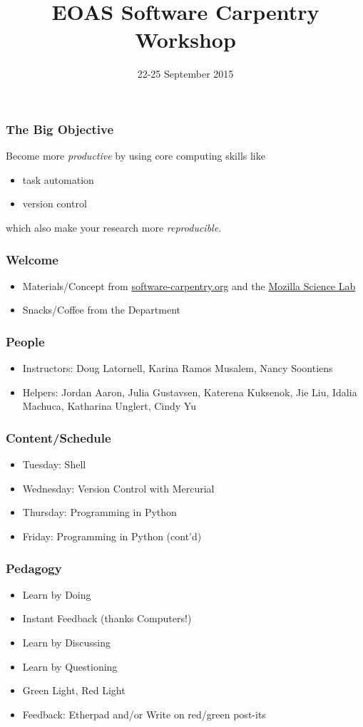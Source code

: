 \documentclass{beamer}
\title[]{EOAS Software Carpentry Workshop}
\subtitle[]{}
\date[]{22-25 September 2015}
\begin{document}




\begin{frame}[plain]
  \titlepage
\end{frame}


\begin{frame}
  \frametitle{The Big Objective}
  Become more {\em productive} by using core computing skills like
  \begin{itemize}
    \item task automation
    \item version control
  \end{itemize}
  which also make your research more {\em reproducible}.
\end{frame}


\begin{frame}
  \frametitle{Welcome}
  \begin{itemize}
    \item Materials/Concept from \href{http://software-carpentry.org/}{software-carpentry.org} and the \href{https://wiki.mozilla.org/ScienceLab}{Mozilla Science Lab}
    \item Snacks/Coffee from the Department
  \end{itemize}
\end{frame}


\begin{frame}
  \frametitle{People}
  \begin{itemize}
    \item Instructors: Doug Latornell, Karina Ramos Musalem, Nancy Soontiens
    \item Helpers: Jordan Aaron, Julia Gustavsen, Katerena Kuksenok, Jie Liu, Idalia Machuca, Katharina Unglert, Cindy Yu
  \end{itemize}
\end{frame}


\begin{frame}
  \frametitle{Content/Schedule}
  \begin{itemize}
    \item Tuesday: Shell
    \item Wednesday: Version Control with Mercurial
    \item Thursday: Programming in Python
    \item Friday: Programming in Python (cont'd)
  \end{itemize}
\end{frame}


\begin{frame}
  \frametitle{Pedagogy}
  \begin{itemize}
    \item Learn by Doing
    \item Instant Feedback (thanks Computers!)
    \item Learn by Discussing
    \item Learn by Questioning
    \item Green Light, Red Light
    \item Feedback: Etherpad and/or Write on red/green post-its
  \end{itemize}
\end{frame}
\end{document}
